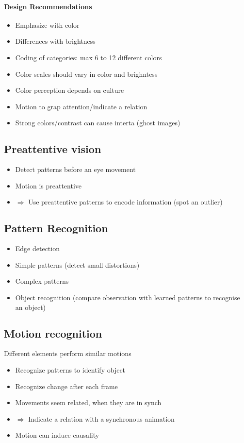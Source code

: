 \documentclass[10pt,a4paper]{article}
\begin{document}
	\paragraph*{Design Recommendations}
	\begin{itemize}
		\item Emphasize with color
		\item Differences with brightness
		\item Coding of categories: max 6 to 12 different colors
		\item Color scales should vary in color and brighntess 
		\item Color perception depends on culture
		\item Motion to grap attention/indicate a relation
		\item Strong colors/contrast can cause interta (ghost images)
	\end{itemize}
	
	
	\subsection{Preattentive vision}
	\begin{itemize}
		\item Detect patterns before an eye movement
		\item Motion is preattentive
		\item $ \Rightarrow $ Use preattentive patterns to encode information (spot an outlier)
	\end{itemize}
	
	\subsection{Pattern Recognition}
	\begin{itemize}
		\item Edge detection
		\item Simple patterns (detect small distortions)
		\item Complex patterns
		\item Object recognition (compare observation with learned patterns to recognise an object)
	\end{itemize}
	
	
	\subsection{Motion recognition}
	Different elements perform similar motions
	\begin{itemize}
		\item Recognize patterns to identify object
		\item Recognize change after each frame
		\item Movements seem related, when they are in synch
		\item $ \Rightarrow $ Indicate a relation with a synchronous animation 
		\item Motion can induce causality
	\end{itemize}
	
\end{document}
